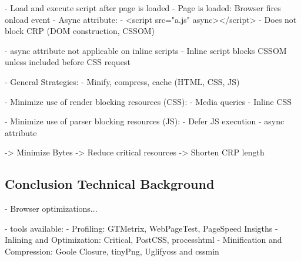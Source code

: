 	- Load and execute script after page is loaded
	- Page is loaded: Browser fires onload event
	- Async attribute:
		- <script src="a.js" async></script>
		- Does not block CRP (DOM construction, CSSOM)

	- async attribute not applicable on inline scripts
	- Inline script blocks CSSOM unless included before CSS request


- General Strategies:
	- Minify, compress, cache (HTML, CSS, JS)

	- Minimize use of render blocking resources (CSS):
		- Media queries
		- Inline CSS

	- Minimize use of parser blocking resources (JS):
		- Defer JS execution
		- async attribute


	-> Minimize Bytes
	-> Reduce critical resources
	-> Shorten CRP length



























\subsection{Conclusion Technical Background}







- Browser optimizations...

- tools available:
- Profiling: GTMetrix, WebPageTest, PageSpeed Insigths
- Inlining and Optimization: Critical, PostCSS, processhtml
- Minification and Compression: Goole Closure, tinyPng, Uglifycss and cssmin



